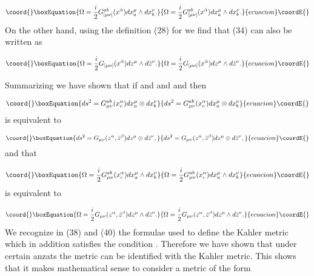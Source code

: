 \documentclass[a4paper,12pt]{article}
\begin{document}
\begin{equation}\coord{}\boxEquation{
\Omega =\frac{i}{2}G_{[\mu \nu ]}^{ab}(x^{\hat{\alpha}})dx_{a}^{\mu }\wedge
dx_{b}^{\nu }.  \label{35}
}{
\Omega =\frac{i}{2}G_{[\mu \nu ]}^{ab}(x^{\hat{\alpha}})dx_{a}^{\mu }\wedge
dx_{b}^{\nu }.  }{ecuacion}\coordE{}\end{equation}
On the other hand, using the definition (28) for \coordHE{} we find that
(34) can also be written as

\begin{equation}\coord{}\boxEquation{
\Omega =\frac{i}{2}G_{[\mu \nu ]}(x^{\hat{\alpha}})dz^{\mu }\wedge d\bar{z}
^{\nu }.  \label{36}
}{
\Omega =\frac{i}{2}G_{[\mu \nu ]}(x^{\hat{\alpha}})dz^{\mu }\wedge d\bar{z}
^{\nu }.  }{ecuacion}\coordE{}\end{equation}

Summarizing we have shown that if \coordHE{} and \coordHE{} and \coordHE{} and \coordHE{} then

\begin{equation}\coord{}\boxEquation{
ds^{2}=G_{\mu \nu }^{ab}(x_{c}^{\alpha })dx_{a}^{\mu }\otimes dx_{b}^{\nu }
\label{37}
}{
ds^{2}=G_{\mu \nu }^{ab}(x_{c}^{\alpha })dx_{a}^{\mu }\otimes dx_{b}^{\nu }
}{ecuacion}\coordE{}\end{equation}
is equivalent to

\begin{equation}\coord{}\boxEquation{
ds^{2}=G_{\mu \nu }(z^{\alpha },\bar{z}^{\beta })dz^{\mu }\otimes d\bar{z}
^{\nu },  \label{38}
}{
ds^{2}=G_{\mu \nu }(z^{\alpha },\bar{z}^{\beta })dz^{\mu }\otimes d\bar{z}
^{\nu },  }{ecuacion}\coordE{}\end{equation}
and that

\begin{equation}\coord{}\boxEquation{
\Omega =\frac{i}{2}G_{\mu \nu }^{ab}(x_{c}^{\alpha })dx_{a}^{\mu }\wedge
dx_{b}^{\nu }  \label{39}
}{
\Omega =\frac{i}{2}G_{\mu \nu }^{ab}(x_{c}^{\alpha })dx_{a}^{\mu }\wedge
dx_{b}^{\nu }  }{ecuacion}\coordE{}\end{equation}
is equivalent to

\begin{equation}\coord{}\boxEquation{
\Omega =\frac{i}{2}G_{\mu \nu }(z^{\alpha },\bar{z}^{\beta })dz^{\mu }\wedge
d\bar{z}^{\nu }.  \label{40}
}{
\Omega =\frac{i}{2}G_{\mu \nu }(z^{\alpha },\bar{z}^{\beta })dz^{\mu }\wedge
d\bar{z}^{\nu }.  }{ecuacion}\coordE{}\end{equation}
We recognize in (38) and (40) the formulae used to define the Kahler metric
which in addition satisfies the condition \coordHE{}. Therefore we have
shown that under certain anzats the metric \coordHE{} can be identified with the Kahler metric. This shows that it makes
mathematical sense to consider a metric of the form \coordHE{}
\end{document}
